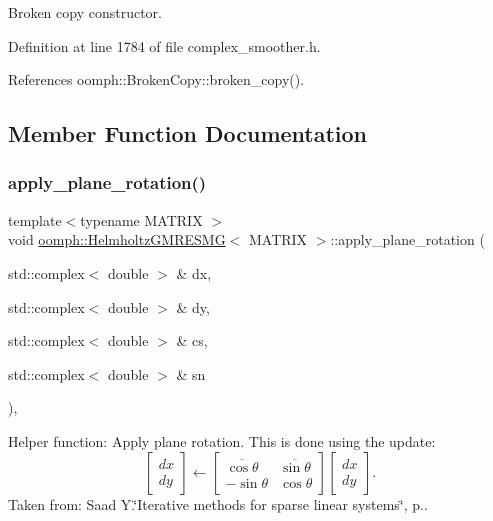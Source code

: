 Broken copy constructor. 



Definition at line 1784 of file complex\+\_\+smoother.\+h.



References oomph\+::\+Broken\+Copy\+::broken\+\_\+copy().



\subsection{Member Function Documentation}
\mbox{\label{classoomph_1_1HelmholtzGMRESMG_a6b9f8cacb73c1bcad749289aac649505}} 
\subsubsection{\texorpdfstring{apply\+\_\+plane\+\_\+rotation()}{apply\_plane\_rotation()}}
{\footnotesize\ttfamily template$<$typename M\+A\+T\+R\+IX $>$ \\
void \hyperlink{classoomph_1_1HelmholtzGMRESMG}{oomph\+::\+Helmholtz\+G\+M\+R\+E\+S\+MG}$<$ M\+A\+T\+R\+IX $>$\+::apply\+\_\+plane\+\_\+rotation (\begin{DoxyParamCaption}\item[{std\+::complex$<$ double $>$ \&}]{dx,  }\item[{std\+::complex$<$ double $>$ \&}]{dy,  }\item[{std\+::complex$<$ double $>$ \&}]{cs,  }\item[{std\+::complex$<$ double $>$ \&}]{sn }\end{DoxyParamCaption})\hspace{0.3cm}{\ttfamily [inline]}, {\ttfamily [protected]}}



Helper function\+: Apply plane rotation. This is done using the update\+: \[ \begin{bmatrix} dx \\ dy \end{bmatrix} \leftarrow \begin{bmatrix} \overline{\cos\theta} & \overline{\sin\theta} \\ -\sin\theta & \cos\theta \end{bmatrix} \begin{bmatrix} dx \\ dy \end{bmatrix}. \] Taken from\+: Saad Y.\char`\"{}\+Iterative methods for sparse linear systems\char`\"{}, p.. 



